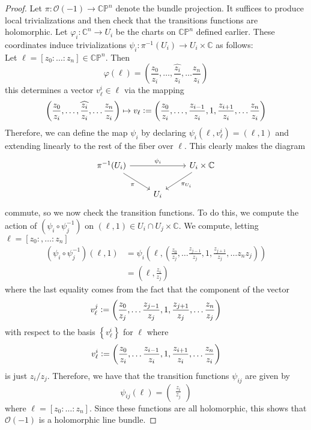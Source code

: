 \documentclass[psamsfonts, 12pt]{amsart}
\theoremstyle{definition}
\theoremstyle{remark}
\renewcommand{\O}{\mathcal{O}}
\newcommand{\C}{\mathbb{C}}
\newcommand{\CP}{\mathbb{CP}}
\newcommand{\inv}{^{-1}}
\newcommand{\set}[1]{\left\lbrace #1 \right\rbrace}
\newcommand{\defeq}{\vcentcolon=}
\begin{document}
\begin{proof}
Let $\pi : \O(-1) \to \CP^n$ denote the bundle projection.
It suffices to produce local trivializations and then check that the transitions
functions are holomorphic. Let $\varphi_i : \C^n \to U_i$ be the charts on
$\CP^n$ defined earlier. These coordinates induce trivializations
$\psi_i : \pi\inv(U_i) \to U_i \times \C$ as follows: \\

Let $\ell = [z_0 : \ldots : z_n] \in \CP^n$. Then
\[
\varphi(\ell) = \left(\frac{z_0}{z_i},\ldots,\widehat{\frac{z_i}{z_i}},\ldots
\frac{z_n}{z_i} \right)
\]
this determines a vector $v^i_\ell \in \ell$ via the mapping
\[
\left(\frac{z_0}{z_i},\ldots,\widehat{\frac{z_i}{z_i}},\ldots
\frac{z_n}{z_i} \right) \mapsto v_\ell\defeq
\left(\frac{z_0}{z_i},\ldots,\frac{z_{i-1}}{z_i},1,\frac{z_{i+1}}{z_i},\ldots
\frac{z_n}{z_i} \right)
\]
Therefore, we can define the map $\psi_i$ by declaring $\psi_i(\ell,v^i_\ell) = (\ell,1)$
and extending linearly to the rest of the fiber over $\ell$. This clearly makes
the diagram
\[\begin{tikzcd}
\pi\inv(U_i) \ar[dr, "\pi"']\ar[rr, "\psi_i"] & & U_i \times \C \ar[dl, "\pi_{U_i}"] \\
& U_i
\end{tikzcd}\]
commute, so we now check the transition functions. To do this, we compute the
action of $(\psi_i\circ\psi_j\inv)$ on $(\ell, 1) \in U_i\cap U_j \times \C$. We
compute, letting $\ell = [z_0:,\ldots : z_n]$
\begin{align*}
(\psi_i\circ\psi_j\inv)(\ell, 1)
&= \psi_i\left(\ell, \left( \frac{z_0}{z_j},\ldots
\frac{z_{j-1}}{z_j},1,\frac{z_{j+1}}{z_j},\ldots {z_n}{z_j} \right)\right) \\
&= \left(\ell, \frac{z_i}{z_j}\right)
\end{align*}
where the last equality comes from the fact that the component of the vector
\[
v^j_\ell \defeq \left( \frac{z_0}{z_j},\ldots
\frac{z_{j-1}}{z_j},1,\frac{z_{j+1}}{z_j},\ldots \frac{z_n}{z_j} \right)
\]
with respect to the basis $\set{v^i_\ell}$ for $\ell$ where
\[
v^i_\ell \defeq \left( \frac{z_0}{z_i},\ldots
\frac{z_{i-1}}{z_i},1,\frac{z_{i+1}}{z_i},\ldots \frac{z_n}{z_i} \right)
\]
is just $z_i/z_j$. Therefore, we have that the transition functions $\psi_{ij}$
are given by
\[
\psi_{ij}(\ell) = \begin{pmatrix}
\frac{z_i}{z_j}
\end{pmatrix}
\]
where $\ell = [z_0: \ldots : z_n]$. Since these functions are all holomorphic,
this shows that $\O(-1)$ is a holomorphic line bundle.
\end{proof}
\end{document}

